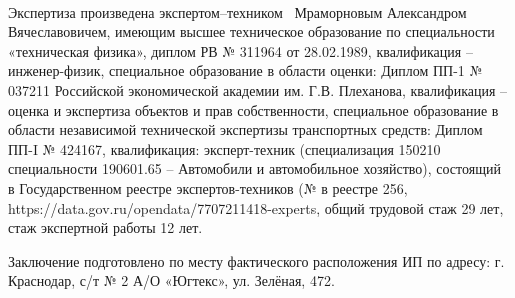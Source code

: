 \paragraph*{}
Экспертиза произведена  экспертом--техником
\,  Мраморновым Александром Вячеславовичем, имеющим высшее техническое образование по специальности «техническая физика», диплом РВ № 311964 от 28.02.1989, квалификация -- инженер-физик, специальное образование в области оценки: Диплом ПП-1 № 037211 Российской экономической академии им. Г.В. Плеханова, квалификация -- оценка и экспертиза объектов и прав собственности, специальное образование в области независимой технической экспертизы транспортных средств: Диплом ПП-I № 424167, квалификация: эксперт-техник (специализация 150210 специальности 190601.65 – Автомобили и автомобильное хозяйство), состоящий в Государственном реестре экспертов-техников (№ в реестре 256, https://data.gov.ru/opendata/7707211418-experts,  общий трудовой  стаж 29 лет, стаж  экспертной работы  12 лет. \par Заключение подготовлено по месту фактического расположения ИП по адресу: г. Краснодар, с/т № 2 А/О «Югтекс», ул. Зелёная, 472.
